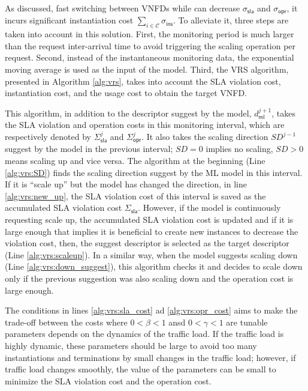 \documentclass[conference, final]{IEEEtran}
\begin{document}
{As discussed, fast switching between VNFDs while can decrease $\sigma_{\textsf{sla}}$ and $\sigma_{\textsf{opr}}$, it incurs significant instantiation cost $\sum_{i \in \mathcal{C}}{\sigma_{\textsf{ins}}}$. To alleviate it, three steps are taken into account in this solution. First, the monitoring period is much larger than the request inter-arrival time to avoid triggering the scaling operation per request. Second, instead of the instantaneous monitoring data, the exponential moving average is used as the input of the model. Third, the VRS algorithm, presented in Algorithm \ref{alg:vrs}, takes into account the SLA violation cost, instantiation cost, and the usage cost to obtain the target VNFD. 

This algorithm, in addition to the descriptor suggest by the model, $d^{j+1}_{\textsf{ml}}$, takes the SLA violation and operation costs in this monitoring interval, which are respectively denoted by $\Sigma^{j}_{\textsf{sla}}$ and $\Sigma^{j}_{\textsf{opr}}$. It also takes the scaling direction $SD^{j-1}$ suggest by the model in the previous interval; $SD = 0$ implies no scaling, $SD > 0$ means scaling up and vice versa. The algorithm at the beginning (Line \ref{alg:vrs:SD}) finds the scaling direction suggest by the ML model in this interval. If it is ``scale up'' but the model has changed the direction, in line \ref{alg:vrs:new_up}, the SLA violation cost of this interval is saved as the accumulated SLA violation cost $\Sigma_{\textsf{sla}}$. However, if the model is continuously requesting scale up, the accumulated SLA violation cost is updated and if it is large enough that implies it is beneficial to create new instances to decrease the violation cost, then, the suggest descriptor is selected as the target descriptor (Line \ref{alg:vrs:scaleup}). In a similar way, when the model suggests scaling down (Line \ref{alg:vrs:down_suggest}), this algorithm checks it and decides to scale down only if the previous suggestion was also scaling down and the operation cost is large enough. 

The conditions in lines \ref{alg:vrs:sla_cost} ad \ref{alg:vrs:opr_cost} aims to make the trade-off between the costs where $0 < \beta <1$ ansd $0< \gamma <1$ are tunable parameters depends on the dynamics of the traffic load. If the traffic load is highly dynamic, these parameters should be large to avoid too many instantiations and terminations by small changes in the traffic load; however, if traffic load changes smoothly, the value of the parameters can be small to minimize the SLA violation cost and the operation cost.

}
\end{document}
